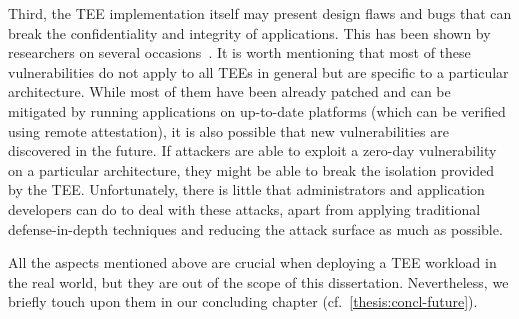 Third, the \ac{TEE} implementation itself may present design flaws and bugs that
can break the confidentiality and integrity of applications. This has been shown
by researchers on several
occasions~\cite{morbitzer2018severed,securingUnseen,cui2021smashex,schluter2024heckler,schluter2024wesee,li2022cipherleaks,schaik2024sgxsok}.
It is worth mentioning that most of these vulnerabilities do not apply to all
\acp{TEE} in general but are specific to a particular architecture. While most
of them have been already patched and can be mitigated by running applications
on up-to-date platforms (which can be verified using remote attestation), it is
also possible that new vulnerabilities are discovered in the future. If
attackers are able to exploit a zero-day vulnerability on a particular
architecture, they might be able to break the isolation provided by the
\ac{TEE}. Unfortunately, there is little that administrators and application
developers can do to deal with these attacks, apart from applying traditional
defense-in-depth techniques and reducing the attack surface as much as possible.

All the aspects mentioned above are crucial when deploying a \ac{TEE} workload
in the real world, but they are out of the scope of this dissertation.
Nevertheless, we briefly touch upon them in our concluding chapter
(cf.~\cref{thesis:concl-future}).